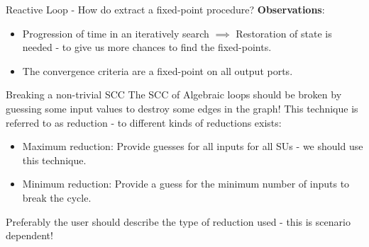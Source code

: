 \documentclass{beamer}
\begin{document}
\begin{frame}{Reactive Loop - How do extract a fixed-point procedure?}
    \textbf{Observations}: 
    \begin{itemize}
        \item Progression of time in an iteratively search $\implies$ Restoration of state is needed - to give us more chances to find the fixed-points. 
        \item The convergence criteria are a fixed-point on all output ports.
    \end{itemize}
\end{frame}

\begin{frame}{Breaking a non-trivial SCC}
    The SCC of Algebraic loops should be broken by guessing some input values to destroy some edges in the graph!
    This technique is referred to as reduction - to different kinds of reductions exists:
    \begin{itemize}
        \item Maximum reduction: Provide guesses for all inputs for all SUs - we should use this technique. 
        \item Minimum reduction: Provide a guess for the minimum number of inputs to break the cycle.
    \end{itemize}
    Preferably the user should describe the type of reduction used - this is scenario dependent!
\end{frame}
\end{document}
